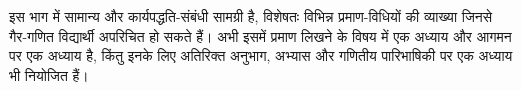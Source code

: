 \documentclass[../../include/open-logic-part]{subfiles}
\begin{document}

\begin{editorial}
  इस भाग में सामान्य और कार्यपद्धति-संबंधी सामग्री है, विशेषतः विभिन्न
  प्रमाण-विधियों की व्याख्या जिनसे गैर-गणित विद्यार्थी अपरिचित हो सकते हैं।
  अभी इसमें प्रमाण लिखने के विषय में एक अध्याय और आगमन पर एक अध्याय है,
  किंतु इनके लिए अतिरिक्त अनुभाग, अभ्यास और गणितीय पारिभाषिकी पर एक अध्याय
  भी नियोजित हैं।
\end{editorial}



\OLEndPartHook
\end{document}
